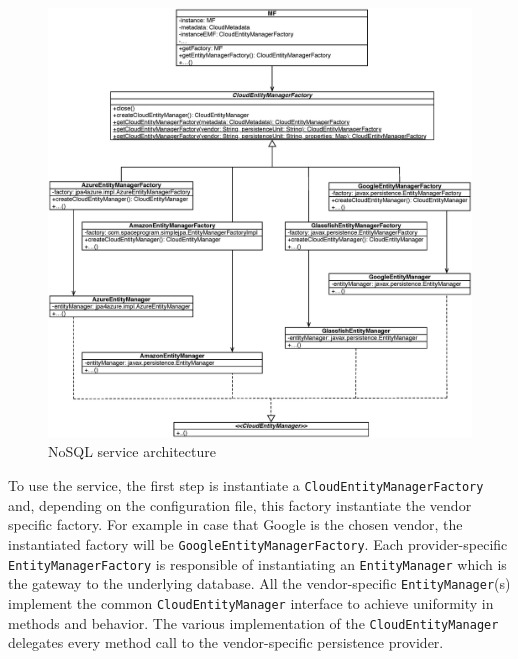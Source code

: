 \begin{figure}[tbh]
  \centering
  \includegraphics[width=14cm]{images/cpim_nosql_old}
  \caption{NoSQL service architecture}
  \label{fig:cpim-nosql}
\end{figure}

\noindent To use the service, the first step is instantiate a \texttt{CloudEntityManagerFactory} and, depending on the configuration file, this factory instantiate the vendor specific factory. For example in case that Google is the chosen vendor, the instantiated factory will be \texttt{GoogleEntityManagerFactory}. 
Each provider-specific \texttt{EntityManagerFactory} is responsible of instantiating an \texttt{EntityManager} which is the gateway to the underlying database. All the vendor-specific \texttt{EntityManager}(s) implement the common \texttt{CloudEntityManager} interface to achieve uniformity in methods and behavior.
The various implementation of the \texttt{CloudEntityManager} delegates every method call to the vendor-specific persistence provider. 

